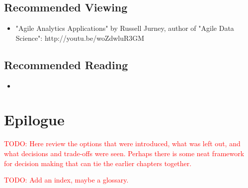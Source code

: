 \documentclass[11pt]{book}
\newcommand{\todo}[1]{\textcolor{red}{TODO: #1}} %
\begin{document}
\section*{Recommended Viewing}
\begin{itemize}
    \item "Agile Analytics Applications" by Russell Jurney, author of "Agile Data Science": http://youtu.be/woZdwluR3GM
\end{itemize}

\section*{Recommended Reading}
\begin{itemize}
    \item 
\end{itemize}

























\chapter*{Epilogue}

\todo{Here review the options that were introduced, what was left out, and what decisions and trade-offs were seen.  Perhaps there is some neat framework for decision making that can tie the earlier chapters together.}

\todo{Add an index, maybe a glossary.}
\end{document}
